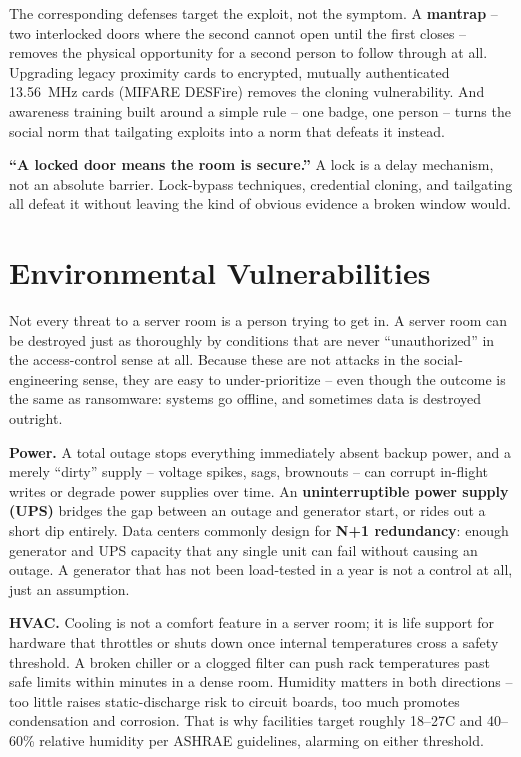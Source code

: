 The corresponding defenses target the exploit, not the symptom. A \textbf{mantrap} -- two
interlocked doors where the second cannot open until the first closes -- removes the physical
opportunity for a second person to follow through at all. Upgrading legacy proximity cards to
encrypted, mutually authenticated 13.56~MHz cards (MIFARE DESFire) removes the cloning
vulnerability. And awareness training built around a simple rule -- one badge, one person -- turns
the social norm that tailgating exploits into a norm that defeats it instead.

\begin{misconception}
\textbf{``A locked door means the room is secure.''} A lock is a delay mechanism, not an absolute
barrier. Lock-bypass techniques, credential cloning, and tailgating all defeat it without leaving
the kind of obvious evidence a broken window would.
\end{misconception}

\section{Environmental Vulnerabilities}

Not every threat to a server room is a person trying to get in. A server room can be destroyed
just as thoroughly by conditions that are never ``unauthorized'' in the access-control sense at
all. Because these are not attacks in the social-engineering sense, they are easy to
under-prioritize -- even though the outcome is the same as ransomware: systems go offline, and
sometimes data is destroyed outright.

\textbf{Power.} A total outage stops everything immediately absent backup power, and a merely
``dirty'' supply -- voltage spikes, sags, brownouts -- can corrupt in-flight writes or degrade
power supplies over time. An \textbf{uninterruptible power supply (UPS)} bridges the gap between
an outage and generator start, or rides out a short dip entirely. Data centers commonly
design for \textbf{N+1 redundancy}: enough generator and UPS capacity that any single unit can
fail without causing an outage. A generator that has not been load-tested in a year is not a
control at all, just an assumption.

\textbf{HVAC.} Cooling is not a comfort feature in a server room; it is life support for hardware
that throttles or shuts down once internal temperatures cross a safety threshold. A broken chiller
or a clogged filter can push rack temperatures past safe limits within minutes in a dense room.
Humidity matters in both directions -- too little raises static-discharge risk to circuit boards,
too much promotes condensation and corrosion. That is why facilities target roughly
18--27\textdegree{}C and 40--60\% relative humidity per ASHRAE guidelines, alarming on either
threshold.

